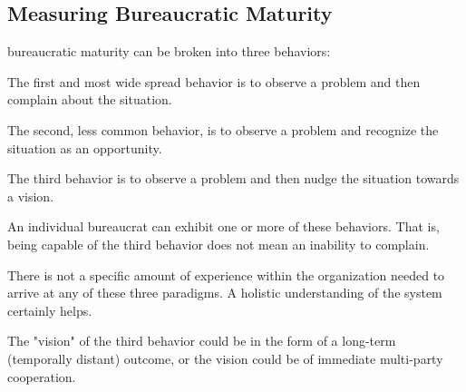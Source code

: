 \subsection{Measuring Bureaucratic Maturity}

bureaucratic maturity can be broken into three behaviors: 

The first and most wide spread behavior is to observe a problem and then complain about the situation. 

The second, less common behavior, is to observe a problem and recognize the situation as an opportunity. 

The third behavior is to observe a problem and then nudge the situation towards a vision. 



An individual bureaucrat can exhibit one or more of these behaviors. That is, being capable of the third behavior does not mean an inability to complain. 

There is not a specific amount of experience within the organization needed to arrive at any of these three paradigms. A holistic understanding of the system certainly helps.

The "vision" of the third behavior could be in the form of a long-term (temporally distant) outcome, or the vision could be of immediate multi-party cooperation. 